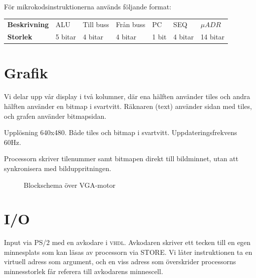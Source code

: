 \documentclass[]{article}
\begin{document}
\noindent
För mikrokodsinstruktionerna används följande format:

\bigskip
\begin{tabular}{l|llllll}
	\textbf{Beskrivning} & ALU     & Till buss & Från buss & PC    & SEQ & $\mu ADR $ \\
	\textbf{Storlek}     & 5 bitar & 4 bitar   & 4 bitar   & 1 bit & 4 bitar & 14 bitar
\end{tabular}
\bigskip
\newpage
\section{Grafik} 
Vi delar upp vår display i två kolumner, där ena hälften använder tiles och andra hälften använder en bitmap i svartvitt. Räknaren (text) använder sidan med tiles, och grafen använder bitmapsidan.

Upplösning 640x480. Både tiles och bitmap i svartvitt. Uppdateringsfrekvens 60Hz.

Processorn skriver tilenummer samt bitmapen direkt till bildminnet, utan att synkronisera med bilduppritningen.

\begin{figure}[h]
	\caption{Blockschema över VGA-motor}
\end{figure}


\newpage

\section{I/O}
Input via PS/2 med en avkodare i \textsc{vhdl}. Avkodaren skriver ett tecken till en egen minnesplats som kan läsas av processorn via STORE. Vi låter instruktionen ta en virtuell adress som argument, och en viss adress som överskrider processorns minnesstorlek får referera till avkodarens minnescell.
\end{document}
